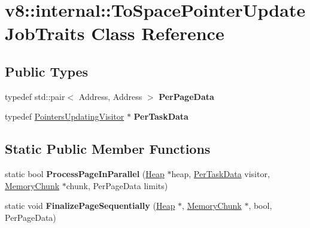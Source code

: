 \hypertarget{classv8_1_1internal_1_1_to_space_pointer_update_job_traits}{}\section{v8\+:\+:internal\+:\+:To\+Space\+Pointer\+Update\+Job\+Traits Class Reference}
\label{classv8_1_1internal_1_1_to_space_pointer_update_job_traits}
\subsection*{Public Types}
\begin{DoxyCompactItemize}
\item 
typedef std\+::pair$<$ Address, Address $>$ {\bfseries Per\+Page\+Data}\hypertarget{classv8_1_1internal_1_1_to_space_pointer_update_job_traits_addc9cbbe76dd3e0a3ce2b0ee5f658a01}{}\label{classv8_1_1internal_1_1_to_space_pointer_update_job_traits_addc9cbbe76dd3e0a3ce2b0ee5f658a01}

\item 
typedef \hyperlink{classv8_1_1internal_1_1_pointers_updating_visitor}{Pointers\+Updating\+Visitor} $\ast$ {\bfseries Per\+Task\+Data}\hypertarget{classv8_1_1internal_1_1_to_space_pointer_update_job_traits_a7d07d668dcebfffc9840dc351680cf81}{}\label{classv8_1_1internal_1_1_to_space_pointer_update_job_traits_a7d07d668dcebfffc9840dc351680cf81}

\end{DoxyCompactItemize}
\subsection*{Static Public Member Functions}
\begin{DoxyCompactItemize}
\item 
static bool {\bfseries Process\+Page\+In\+Parallel} (\hyperlink{classv8_1_1internal_1_1_heap}{Heap} $\ast$heap, \hyperlink{classv8_1_1internal_1_1_pointers_updating_visitor}{Per\+Task\+Data} visitor, \hyperlink{classv8_1_1internal_1_1_memory_chunk}{Memory\+Chunk} $\ast$chunk, Per\+Page\+Data limits)\hypertarget{classv8_1_1internal_1_1_to_space_pointer_update_job_traits_adb4865fa14d7ed40aff468e15f02d2b3}{}\label{classv8_1_1internal_1_1_to_space_pointer_update_job_traits_adb4865fa14d7ed40aff468e15f02d2b3}

\item 
static void {\bfseries Finalize\+Page\+Sequentially} (\hyperlink{classv8_1_1internal_1_1_heap}{Heap} $\ast$, \hyperlink{classv8_1_1internal_1_1_memory_chunk}{Memory\+Chunk} $\ast$, bool, Per\+Page\+Data)\hypertarget{classv8_1_1internal_1_1_to_space_pointer_update_job_traits_aa4d388aea952434a8af882cc7eecbe33}{}\label{classv8_1_1internal_1_1_to_space_pointer_update_job_traits_aa4d388aea952434a8af882cc7eecbe33}

\end{DoxyCompactItemize}
